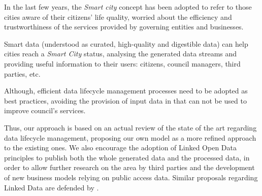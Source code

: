 In the last few years, the \textit{Smart city} concept has been adopted to refer to those cities aware of their citizens' life quality, worried about the efficiency and trustworthiness of the services provided by governing entities and businesses.

Smart data (understood as curated, high-quality and digestible data) can help cities reach a \textit{Smart City} status, analysing the generated data streams and providing useful information to their users: citizens, council managers, third parties, etc.

Although, efficient data lifecycle management processes need to be adopted as best practices, avoiding the provision of input data in that can not be used to improve council's services.

Thus, our approach is based on an actual review of the state of the art regarding data lifecycle management, proposing our own model as a more refined approach to the existing ones. We also encourage the adoption of Linked Open Data principles to publish both the whole generated data and the processed data, in order to allow further research on the area by third parties and the development of new business models relying on public access data. Similar proposals regarding Linked Data are defended by \cite{Bizer:2012:MUB:2094114.2094129}.
